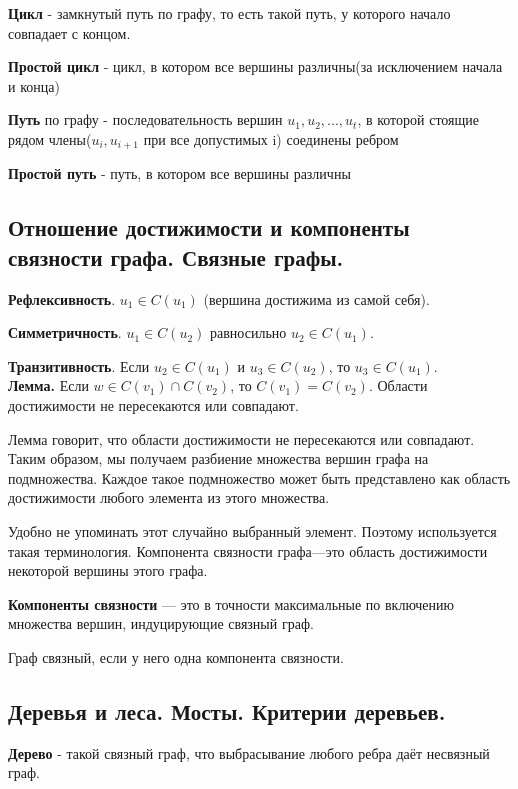 \documentclass[a4paper, 10pt]{article}
\begin{document}
\textbf{Цикл} - замкнутый путь по графу, то есть такой путь, у которого начало совпадает с концом.

\textbf{Простой цикл} - цикл, в котором все вершины различны(за исключением начала и конца)

\textbf{Путь} по графу - последовательность вершин $u_1, u_2, ..., u_t$, в которой стоящие рядом члены($u_{i}, u_{i+1}$ при все допустимых i) соединены ребром

\textbf{Простой путь} -  путь, в котором все вершины различны


\subsection{Отношение достижимости и компоненты связности графа. Связные графы.}



\textbf{Рефлексивность}. $u_1 \in C(u_1)$ (вершина достижима из самой себя).

\textbf{Симметричность}. $u_1 \in C(u_2)$ равносильно $u_2 \in C(u_1)$.

\textbf{Транзитивность}. Если $u_2 \in C(u_1)$ и $u_3 \in C(u_2)$, то $u_3 \in C(u_1)$.  \\

\textbf{Лемма.} Если $w \in C(v_1) \cap C(v_2)$, то $C(v_1) = C(v_2)$. Области достижимости не пересекаются или совпадают.


Лемма говорит, что области достижимости не пересекаются или совпадают. Таким образом, мы получаем разбиение множества вершин графа на подмножества. Каждое такое подмножество может быть представлено как область достижимости любого элемента из этого множества.

Удобно не упоминать этот случайно выбранный элемент. Поэтому используется такая терминология. Компонента связности графа—это область достижимости некоторой вершины этого графа.

\textbf{Компоненты связности} — это в точности максимальные по включению множества вершин, индуцирующие связный граф.

Граф связный, если у него одна компонента связности.


\subsection{Деревья и леса. Мосты. Критерии деревьев.}

\textbf{Дерево} - такой связный граф, что выбрасывание любого ребра даёт несвязный граф.
\end{document}
